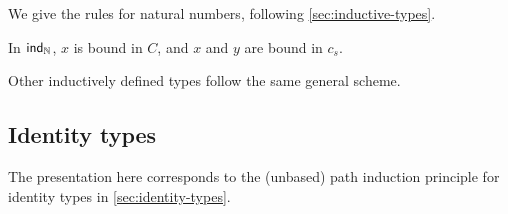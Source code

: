 %

We give the rules for natural numbers, following \cref{sec:inductive-types}.

%
In $\mathsf{ind}_{\mathbb{N}}$, $x$ is bound in $C$, and $x$ and $y$ are bound in $c_s$.

Other inductively defined types follow the same general scheme.

%

\subsection{Identity types}

\label{sec:more-formal-identity}

%

The presentation here corresponds to the (unbased) path induction principle for identity types in
\cref{sec:identity-types}.


